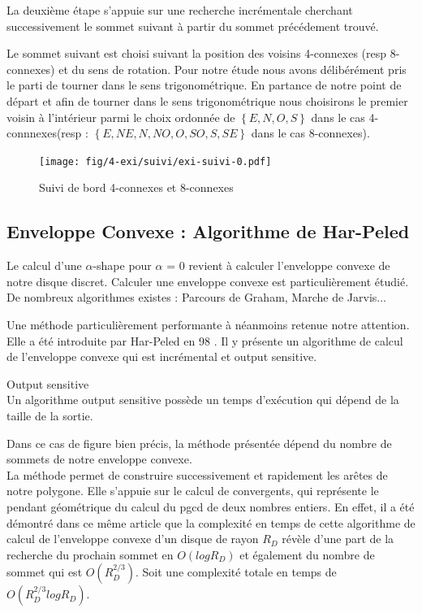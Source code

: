 La deuxième étape s'appuie sur une recherche incrémentale cherchant successivement le sommet suivant à partir du sommet précédement trouvé.

Le sommet suivant est choisi suivant la position des voisins 4-connexes (resp 8-connexes) et du sens de rotation. Pour notre étude nous avons délibérément pris le parti de tourner dans le sens trigonométrique. En partance de notre point de départ et afin de tourner dans le sens trigonométrique nous choisirons le premier voisin à l'intérieur parmi le choix ordonnée de $\left\{E, N, O, S\right\}$ dans le cas 4-connnexes(resp :  $\left\{E, NE, N, NO, O, SO, S, SE \right\}$ dans le cas 8-connexes).

\begin{figure}[h!]
  \centering
  \texttt{[image: fig/4-exi/suivi/exi-suivi-0.pdf]}
  \caption{Suivi de bord 4-connexes et 8-connexes}
\end{figure}
  

\subsection{Enveloppe Convexe : Algorithme de Har-Peled}

Le calcul d'une $\alpha$-shape pour $\alpha$ = 0 revient à calculer l'enveloppe convexe de notre disque discret. Calculer une enveloppe convexe est particulièrement étudié. De nombreux algorithmes existes : Parcours de Graham, Marche de Jarvis... 

Une méthode particulièrement performante à néanmoins retenue notre attention. Elle a été introduite par Har-Peled en 98 \cite{HarPeled98}. Il y présente un algorithme de calcul de l'enveloppe convexe qui est incrémental et output sensitive.


\begin{Definition}{Output sensitive}\\
\label{def:os}
      Un algorithme output sensitive possède un temps d’exécution qui dépend de la taille de la sortie.
\end{Definition}

Dans ce cas de figure bien précis, la méthode présentée dépend du nombre de sommets de notre enveloppe convexe. \\

La méthode permet de construire successivement et rapidement les arêtes de notre polygone. Elle s'appuie sur le calcul de convergents, qui représente le pendant géométrique du calcul du pgcd de deux nombres entiers. 
En effet, il a été démontré dans ce même article que la complexité en temps de cette algorithme de calcul de l'enveloppe convexe d'un disque de rayon $R_D$ révèle d'une part de la recherche du prochain sommet en $O(log R_D)$ et également du nombre de sommet qui est $O( R_{D}^{2/3})$. Soit une complexité totale en temps de  $O( R_{D}^{2/3} log R_D)$.


